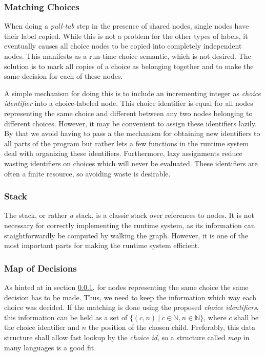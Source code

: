 \subsubsection{Matching Choices}
\label{matching_choices}

When doing a \emph{pull-tab} step in the presence of shared nodes, single nodes have their label copied.
While this is not a problem for the other types of labels, it eventually causes all choice nodes to be copied into completely independent nodes.
This manifests as a run-time choice semantic, which is not desired.
The solution is to mark all copies of a choice as belonging together and to make the same decision for each of these nodes.

A simple mechanism for doing this is to include an incrementing integer as \emph{choice identifier} into a choice-labeled node.
This choice identifier is equal for all nodes representing the same choice and different between any two nodes belonging to different choices.
However, it may be convenient to assign these identifiers lazily.
By that we avoid having to pass a the mechanism for obtaining new identifiers to all parts of the program but rather lets a few functions in the runtime system deal with organizing these identifiers.
Furthermore, lazy assignments reduce wasting identifiers on choices which will never be evaluated.
These identifiers are often a finite resource, so avoiding waste is desirable.


\subsubsection{Stack}
\label{stack}

The stack, or rather \emph{a} stack, is a classic stack over references to nodes.
It is not necessary for correctly implementing the runtime system, as its information can staightforwardly be computed by walking the graph.
However, it is one of the most important parts for making the runtime system efficient.

\subsubsection{Map of Decisions}
\label{modc}

As hinted at in section \ref{matching_choices}, for nodes representing the same choice the same decision has to be made.
Thus, we need to keep the information which way each choice was decided.
If the matching is done using the proposed \emph{choice identifiers}, this information can be held as a set of $\{(c,n) \ | \ c \in \mathbb{N}, n \in \mathbb{N}\}$, where $c$ shall be the choice identifier and $n$ the position of the chosen child.
Preferably, this data structure shall allow fast lookup by the \emph{choice id}, so a structure called \emph{map} in many languages is a good fit.


